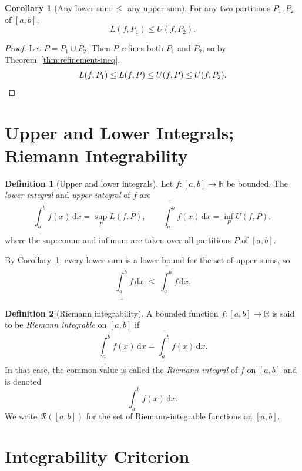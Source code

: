 \documentclass[12pt,a4paper]{book}
\theoremstyle{definition}
\newtheorem{definition}{Definition}[chapter]
\newtheorem{corollary}{Corollary}[chapter]
\newcommand{\R}{\mathbb{R}}
\newcommand{\dd}{\,\mathrm{d}}
\begin{document}
\begin{corollary}[Any lower sum $\le$ any upper sum]\label{cor:lower-le-upper}
  For any two partitions $P_1,P_2$ of $[a,b]$,
  \[
    L(f,P_1) \le U(f,P_2).
  \]
\end{corollary}

\begin{proof}
  Let $P=P_1\cup P_2$.  Then $P$ refines both $P_1$ and $P_2$, so
  by Theorem~\ref{thm:refinement-ineq},
  \[
    L(f,P_1) \le L(f,P) \le U(f,P) \le U(f,P_2). \qedhere
  \]
\end{proof}


\section{Upper and Lower Integrals; Riemann Integrability}\label{sec:upper-lower-int}

\begin{definition}[Upper and lower integrals]\label{def:upper-lower-int}
  Let $f\colon[a,b]\to\R$ be bounded.  The \emph{lower integral} and
  \emph{upper integral} of $f$ are
  \[
    \underline{\int_a^b} f(x)\dd x
      = \sup_P L(f,P),
    \qquad
    \overline{\int_a^b} f(x)\dd x
      = \inf_P U(f,P),
  \]
  where the supremum and infimum are taken over all partitions $P$ of
  $[a,b]$.
\end{definition}

By Corollary~\ref{cor:lower-le-upper}, every lower sum is a lower bound
for the set of upper sums, so
\[
  \underline{\int_a^b} f\dd x
  \;\le\;
  \overline{\int_a^b} f\dd x.
\]

\begin{definition}[Riemann integrability]\label{def:riemann-int}
  A bounded function $f\colon[a,b]\to\R$ is said to be
  \emph{Riemann integrable} on
  $[a,b]$ if
  \[
    \underline{\int_a^b} f(x)\dd x
    = \overline{\int_a^b} f(x)\dd x.
  \]
  In that case, the common value is called the \emph{Riemann integral}
  of $f$ on $[a,b]$ and is denoted
  \[
    \int_a^b f(x)\dd x.
  \]
  We write $\mathcal{R}([a,b])$ for the set of Riemann-integrable
  functions on $[a,b]$.
\end{definition}


\section{Integrability Criterion}\label{sec:int-criterion}
\end{document}

